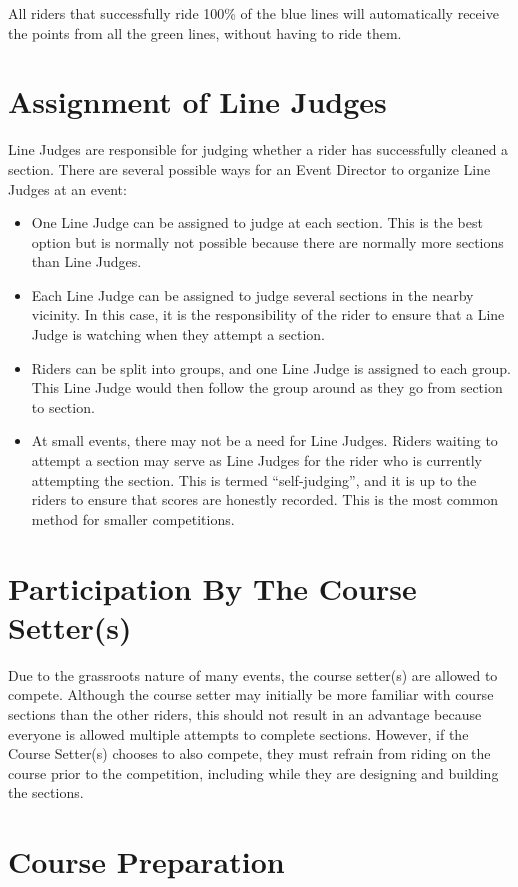 All riders that successfully ride 100\% of the blue lines will automatically receive the points from all the green lines, without having to ride them.

\section{Assignment of Line Judges}
Line Judges are responsible for judging whether a rider has successfully cleaned a section. 
There are several possible ways for an Event Director to organize Line Judges at an event:
\begin{itemize}
\item One Line Judge can be assigned to judge at each section. 
This is the best option but is normally not possible because there are normally more sections than Line Judges.
\item Each Line Judge can be assigned to judge several sections in the nearby vicinity. 
In this case, it is the responsibility of the rider to ensure that a Line Judge is watching when they attempt a section.
\item Riders can be split into groups, and one Line Judge is assigned to each group. 
This Line Judge would then follow the group around as they go from section to section.
\item At small events, there may not be a need for Line Judges. 
Riders waiting to attempt a section may serve as Line Judges for the rider who is currently attempting the section. 
This is termed ``self-judging'', and it is up to the riders to ensure that scores are honestly recorded. 
This is the most common method for smaller competitions.
\end{itemize}

\section{Participation By The Course Setter(s)}

Due to the grassroots nature of many events, the course setter(s) are allowed to compete. 
Although the course setter may initially be more familiar with course sections than the other riders, this should not result in an advantage because everyone is allowed multiple attempts to complete sections. 
However, if the Course Setter(s) chooses to also compete, they must refrain from riding on the course prior to the competition, including while they are designing and building the sections.

\section{Course Preparation}

